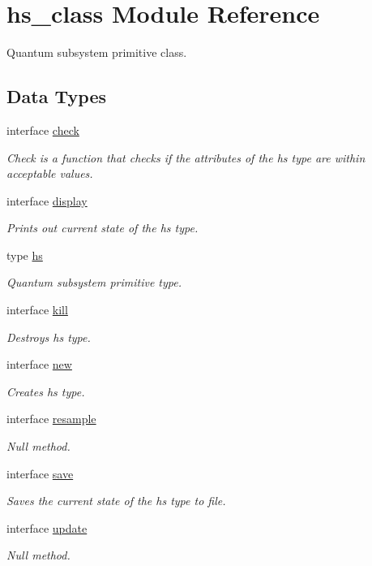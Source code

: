 \hypertarget{classhs__class}{\section{hs\+\_\+class Module Reference}
\label{classhs__class}
}


Quantum subsystem primitive class.  


\subsection*{Data Types}
\begin{DoxyCompactItemize}
\item 
interface \hyperlink{interfacehs__class_1_1check}{check}
\begin{DoxyCompactList}\small\item\em Check is a function that checks if the attributes of the hs type are within acceptable values. \end{DoxyCompactList}\item 
interface \hyperlink{interfacehs__class_1_1display}{display}
\begin{DoxyCompactList}\small\item\em Prints out current state of the hs type. \end{DoxyCompactList}\item 
type \hyperlink{strucths__class_1_1hs}{hs}
\begin{DoxyCompactList}\small\item\em Quantum subsystem primitive type. \end{DoxyCompactList}\item 
interface \hyperlink{interfacehs__class_1_1kill}{kill}
\begin{DoxyCompactList}\small\item\em Destroys hs type. \end{DoxyCompactList}\item 
interface \hyperlink{interfacehs__class_1_1new}{new}
\begin{DoxyCompactList}\small\item\em Creates hs type. \end{DoxyCompactList}\item 
interface \hyperlink{interfacehs__class_1_1resample}{resample}
\begin{DoxyCompactList}\small\item\em Null method. \end{DoxyCompactList}\item 
interface \hyperlink{interfacehs__class_1_1save}{save}
\begin{DoxyCompactList}\small\item\em Saves the current state of the hs type to file. \end{DoxyCompactList}\item 
interface \hyperlink{interfacehs__class_1_1update}{update}
\begin{DoxyCompactList}\small\item\em Null method. \end{DoxyCompactList}\end{DoxyCompactItemize}
